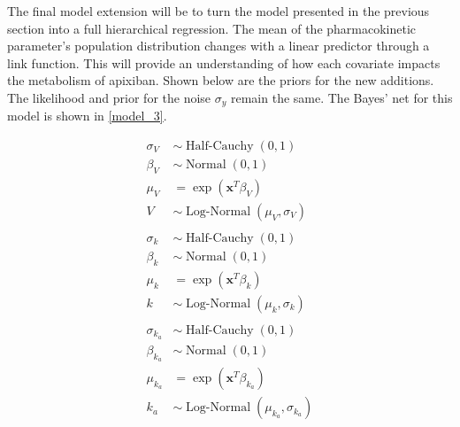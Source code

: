The final model extension will be to turn the model presented in the previous section into a full hierarchical regression.  The mean of the pharmacokinetic parameter's population distribution changes with a linear predictor through a link function. This will provide an understanding of how each covariate impacts the metabolism of apixiban.  Shown below are the priors for the new additions.  The likelihood and prior for the noise $ \sigma_y $ remain the same.  The Bayes' net for this model is shown in \cref{model_3}.

\begin{align}
	\sigma_V &\sim \operatorname{Half-Cauchy}(0,1)\\
	\beta_V &\sim \operatorname{Normal}(0,1)\\ 
	\mu_V &= \exp(\mathbf{x}^T\beta_V) \\
	V &\sim \operatorname{Log-Normal}(\mu_V, \sigma_V) \\ \nonumber \\
	\sigma_k &\sim \operatorname{Half-Cauchy}(0,1)\\
	\beta_k &\sim \operatorname{Normal}(0,1)\\ 
	\mu_k &= \exp(\mathbf{x}^T\beta_k) \\
	k &\sim \operatorname{Log-Normal}(\mu_k, \sigma_k) \\ \nonumber \\	
	\sigma_{k_a} &\sim \operatorname{Half-Cauchy}(0,1)\\
	\beta_{k_a} &\sim \operatorname{Normal}(0,1)\\ 
	\mu_{k_a} &= \exp(\mathbf{x}^T\beta_{k_a}) \\
	k_a &\sim \operatorname{Log-Normal}(\mu_{k_a}, \sigma_{k_a}) 
\end{align}


